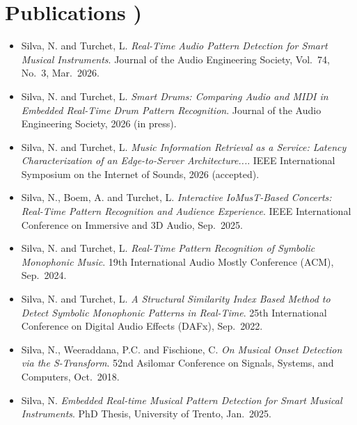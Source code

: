 \documentclass[11pt]{article}
\begin{document}
\section*{Publications \footnotesize {)}}
\begin{itemize}[leftmargin=1.2em, itemsep=-0.25em]
    \item Silva, N. and Turchet, L. \textit{Real-Time Audio Pattern Detection for Smart Musical Instruments}. Journal of the Audio Engineering Society, Vol.~74, No.~3, Mar.~2026. 
    \item Silva, N. and Turchet, L. \textit{Smart Drums: Comparing Audio and MIDI in Embedded Real-Time Drum Pattern Recognition}. Journal of the Audio Engineering Society, 2026 (in press).
    \item Silva, N. and Turchet, L. \textit{Music Information Retrieval as a Service: Latency Characterization of an Edge-to-Server Architecture...}. IEEE International Symposium on the Internet of Sounds, 2026 (accepted).
    \item Silva, N., Boem, A. and Turchet, L. \textit{Interactive IoMusT-Based Concerts: Real-Time Pattern Recognition and Audience Experience}. IEEE International Conference on Immersive and 3D Audio, Sep.~2025.
    \item Silva, N. and Turchet, L. \textit{Real-Time Pattern Recognition of Symbolic Monophonic Music}. 19th International Audio Mostly Conference (ACM), Sep.~2024.
    \item Silva, N. and Turchet, L. \textit{A Structural Similarity Index Based Method to Detect Symbolic Monophonic Patterns in Real-Time}. 25th International Conference on Digital Audio Effects (DAFx), Sep.~2022. 
    \item Silva, N., Weeraddana, P.C. and Fischione, C. \textit{On Musical Onset Detection via the S-Transform}. 52nd Asilomar Conference on Signals, Systems, and Computers, Oct.~2018.
    \item Silva, N. \textit{Embedded Real-time Musical Pattern Detection for Smart Musical Instruments}. PhD Thesis, University of Trento, Jan.~2025.
\end{itemize}
\end{document}
